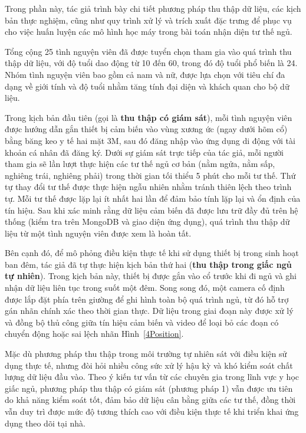 Trong phần này, tác giả trình bày chi tiết phương pháp thu thập dữ liệu, 
các kịch bản thực nghiệm, cũng như quy trình xử lý và trích xuất đặc trưng 
để phục vụ cho việc huấn luyện các mô hình học máy trong bài toán nhận diện tư thế ngủ.

Tổng cộng 25 tình nguyện viên đã được tuyển chọn tham gia vào quá trình 
thu thập dữ liệu, với độ tuổi dao động từ 10 đến 60, trong đó độ tuổi 
phổ biến là 24. Nhóm tình nguyện viên bao gồm cả nam và nữ, được lựa 
chọn với tiêu chí đa dạng về giới tính và độ tuổi nhằm tăng tính đại 
diện và khách quan cho bộ dữ liệu.

Trong kịch bản đầu tiên (gọi là \textbf{thu thập có giám sát}), 
mỗi tình nguyện viên được hướng dẫn gắn thiết bị cảm biến vào vùng 
xương ức (ngay dưới hõm cổ) bằng băng keo y tế hai mặt 3M, 
sau đó đăng nhập vào ứng dụng di động với tài khoản cá nhân đã đăng ký. 
Dưới sự giám sát trực tiếp của tác giả, mỗi người tham gia sẽ lần 
lượt thực hiện các tư thế ngủ cơ bản (nằm ngửa, nằm sấp, nghiêng trái, nghiêng phải) 
trong thời gian tối thiểu 5 phút cho mỗi tư thế. 
Thứ tự thay đổi tư thế được thực hiện ngẫu nhiên nhằm tránh thiên 
lệch theo trình tự. Mỗi tư thế được lặp lại ít nhất hai lần để đảm 
bảo tính lặp lại và ổn định của tín hiệu.
Sau khi xác minh rằng dữ liệu cảm biến đã được lưu trữ đầy đủ 
trên hệ thống (kiểm tra trên MongoDB và giao diện ứng dụng), quá trình 
thu thập dữ liệu từ một tình nguyện viên được xem là hoàn tất.

Bên cạnh đó, để mô phỏng điều kiện thực tế khi sử dụng thiết bị trong 
sinh hoạt ban đêm, tác giả đã tự thực hiện kịch bản thứ hai 
(\textbf{thu thập trong giấc ngủ tự nhiên}). Trong kịch bản này, 
thiết bị được gắn vào cổ trước khi đi ngủ và ghi nhận dữ liệu liên 
tục trong suốt một đêm. Song song đó, một camera cố định được lắp 
đặt phía trên giường để ghi hình toàn bộ quá trình ngủ, từ đó hỗ 
trợ gán nhãn chính xác theo thời gian thực. Dữ liệu trong giai đoạn 
này được xử lý và đồng bộ thủ công giữa tín hiệu cảm biến và video 
để loại bỏ các đoạn có chuyển động hoặc sai lệch nhãn Hình~\ref{4Position}.

Mặc dù phương pháp thu thập trong môi trường tự nhiên sát với điều kiện 
sử dụng thực tế, nhưng đòi hỏi nhiều công sức xử lý hậu kỳ và 
khó kiểm soát chất lượng dữ liệu đầu vào. 
Theo ý kiến tư vấn từ các chuyên gia trong lĩnh vực y học giấc ngủ, 
phương pháp thu thập có giám sát (phương pháp 1) vẫn được ưu tiên do 
khả năng kiểm soát tốt, đảm bảo dữ liệu cân bằng giữa các tư thế, 
đồng thời vẫn duy trì được mức độ tương thích cao với điều kiện 
thực tế khi triển khai ứng dụng theo dõi tại nhà.

